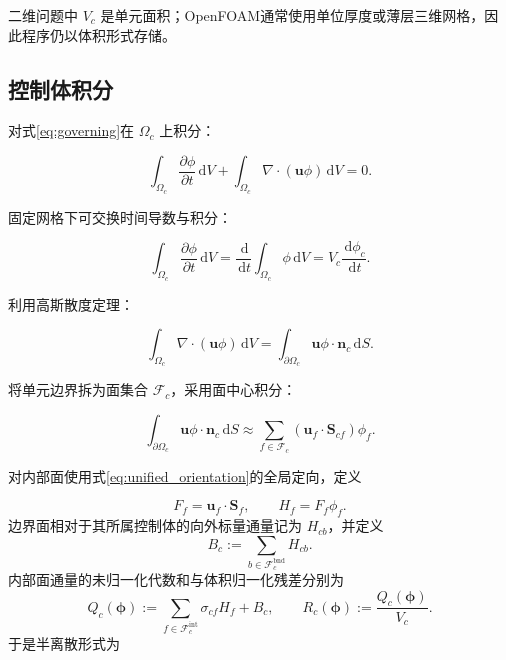 \documentclass[UTF8,12pt,a4paper,fontset=fandol]{ctexart}
\numberwithin{equation}{section}
\newcommand{\dd}{\,\mathrm d}
\newcommand{\Sf}{\bm S}
\begin{document}
二维问题中 $V_c$ 是单元面积；OpenFOAM通常使用单位厚度或薄层三维网格，因此程序仍以体积形式存储。

\subsection{控制体积分}

对式\eqref{eq:governing}在 $\Omega_c$ 上积分：

\begin{equation}
  \int_{\Omega_c}
  \frac{\partial\phi}{\partial t}\dd V
  +
  \int_{\Omega_c}
  \nabla\cdot(\bm u\phi)\dd V
  =0.
\end{equation}

固定网格下可交换时间导数与积分：

\begin{equation}
  \int_{\Omega_c}
  \frac{\partial\phi}{\partial t}\dd V
  =
  \frac{\dd}{\dd t}
  \int_{\Omega_c}\phi\dd V
  =
  V_c\frac{\dd\phi_c}{\dd t}.
\end{equation}

利用高斯散度定理：

\begin{equation}
  \int_{\Omega_c}
  \nabla\cdot(\bm u\phi)\dd V
  =
  \int_{\partial\Omega_c}
  \bm u\phi\cdot\bm n_c\dd S.
\end{equation}

将单元边界拆为面集合 $\mathcal F_c$，采用面中心积分：

\begin{equation}
  \int_{\partial\Omega_c}
  \bm u\phi\cdot\bm n_c\dd S
  \approx
  \sum_{f\in\mathcal F_c}
  (\bm u_f\cdot\Sf_{cf})\phi_f.
\end{equation}

对内部面使用式\eqref{eq:unified_orientation}的全局定向，定义

\begin{equation}
  F_f=\bm u_f\cdot\Sf_f,
  \qquad
  H_f=F_f\phi_f.
\end{equation}
边界面相对于其所属控制体的向外标量通量记为 $H_{cb}$，并定义
\begin{equation}
  B_c:=\sum_{b\in\mathcal F_c^{\mathrm{bnd}}}H_{cb}.
\end{equation}
内部面通量的未归一化代数和与体积归一化残差分别为
\begin{equation}
  \boxed{
  Q_c(\bm\phi)
  :=\sum_{f\in\mathcal F_c^{\mathrm{int}}}\sigma_{cf}H_f+B_c,
  \qquad
  R_c(\bm\phi):=\frac{Q_c(\bm\phi)}{V_c}.}
  \label{eq:advection_residual_definition}
\end{equation}
于是半离散形式为
\end{document}
